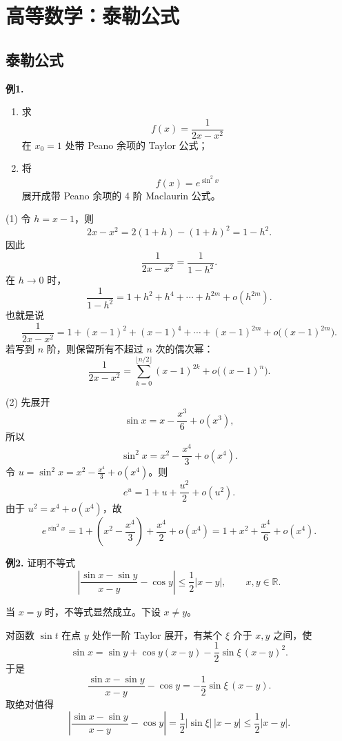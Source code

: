 \chapter{高等数学：泰勒公式}

\section{泰勒公式}

\begin{problemblock}
\textbf{例1.}
\begin{enumerate}[label=(\arabic*), leftmargin=2.2em]
\item 求
\[
f(x)=\frac1{2x-x^2}
\]
在 \(x_0=1\) 处带 Peano 余项的 Taylor 公式；
\item 将
\[
f(x)=e^{\sin^2x}
\]
展开成带 Peano 余项的 4 阶 Maclaurin 公式。
\end{enumerate}
\end{problemblock}
\begin{solutionblock}
(1) 令 \(h=x-1\)，则
\[
2x-x^2=2(1+h)-(1+h)^2=1-h^2.
\]
因此
\[
\frac1{2x-x^2}=\frac1{1-h^2}.
\]
在 \(h\to0\) 时，
\[
\frac1{1-h^2}=1+h^2+h^4+\cdots+h^{2m}+o(h^{2m}).
\]
也就是说
\[
\frac1{2x-x^2}
=1+(x-1)^2+(x-1)^4+\cdots+(x-1)^{2m}
 +o\bigl((x-1)^{2m}\bigr).
\]
若写到 \(n\) 阶，则保留所有不超过 \(n\) 次的偶次幂：
\[
\frac1{2x-x^2}
=\sum_{k=0}^{\lfloor n/2\rfloor}(x-1)^{2k}+o\bigl((x-1)^n\bigr).
\]

(2) 先展开
\[
\sin x=x-\frac{x^3}{6}+o(x^3),
\]
所以
\[
\sin^2x=x^2-\frac{x^4}{3}+o(x^4).
\]
令 \(u=\sin^2x=x^2-\frac{x^4}{3}+o(x^4)\)。则
\[
e^u=1+u+\frac{u^2}{2}+o(u^2).
\]
由于 \(u^2=x^4+o(x^4)\)，故
\[
e^{\sin^2x}
=1+\left(x^2-\frac{x^4}{3}\right)+\frac{x^4}{2}+o(x^4)
=1+x^2+\frac{x^4}{6}+o(x^4).
\]
\end{solutionblock}

\begin{problemblock}
\textbf{例2.} 证明不等式
\[
\left|
\frac{\sin x-\sin y}{x-y}-\cos y
\right|
\le\frac12|x-y|,
\qquad x,y\in\mathbb R.
\]
\end{problemblock}
\begin{solutionblock}
当 \(x=y\) 时，不等式显然成立。下设 \(x\ne y\)。

对函数 \(\sin t\) 在点 \(y\) 处作一阶 Taylor 展开，有某个 \(\xi\) 介于 \(x,y\) 之间，使
\[
\sin x=\sin y+\cos y(x-y)-\frac12\sin\xi\,(x-y)^2.
\]
于是
\[
\frac{\sin x-\sin y}{x-y}-\cos y
=-\frac12\sin\xi\,(x-y).
\]
取绝对值得
\[
\left|
\frac{\sin x-\sin y}{x-y}-\cos y
\right|
=\frac12|\sin\xi|\,|x-y|
\le\frac12|x-y|.
\]
\end{solutionblock}

